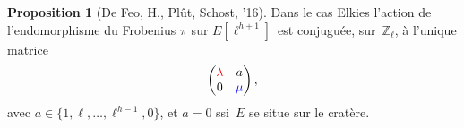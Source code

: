 \documentclass[10pt,a4paper]{beamer}
\theoremstyle{plain}
\theoremstyle{definition}
\theoremstyle{definition}
\theoremstyle{definition}
\newtheorem{prop}[thm]{Proposition}
\theoremstyle{definition}
\theoremstyle{remark}
\theoremstyle{remark}
\begin{document}
\begin{frame}

\begin{prop}[De Feo, H., Pl\^ut, Schost, '16]\label{prop:matrice-Frobenius}
Dans le cas Elkies l'action de l'endomorphisme du Frobenius $\pi$ sur 
$E[\ell^{h+1}]$~est conjuguée, sur~$\mathbb{Z}_{\ell}$, à l'unique matrice
 \[\left ( \begin{matrix}{\color{red}\lambda} & a\\ 0 &
{\color{blue}\mu} \end{matrix}\right ), \]  avec $a \in \{ 1,\ell, \dots,
\ell^{h-1}, 0  \}$, et $a = 0$ ssi~$E$ se situe sur le cratère.

\end{prop}

\begin{figure}
\begin{center}


\end{center}
\end{figure}
\end{frame}
\end{document}

